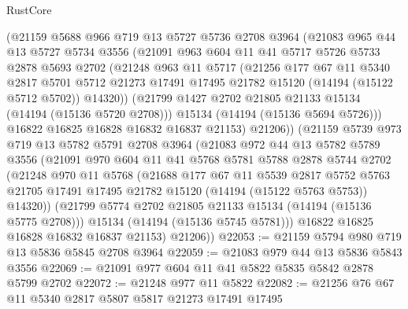 \begin{lexlean}{RustCore}
\begin{coremodule}
        (@21159
          @5688
          @966
          @719
          @13
          @5727
          @5736
          @2708
          @3964
          (@21083
            @965
            @44
            @13
            @5727
            @5734
            @3556
            (@21091
              @963
              @604
              @11
              @41
              @5717
              @5726
              @5733
              @2878
              @5693
              @2702
              (@21248
                @963
                @11
                @5717
                (@21256
                  @177
                  @67
                  @11
                  @5340
                  @2817
                  @5701
                  @5712
                  @21273
                  @17491
                  @17495
                  @21782
                  @15120
                  (@14194 (@15122 @5712 @5702))
                  @14320))
              (@21799 @1427 @2702 @21805 @21133 @15134 (@14194 (@15136 @5720 @2708)))
              @15134
              (@14194 (@15136 @5694 @5726)))
            @16822
            @16825
            @16828
            @16832
            @16837
            @21153)
          @21206))
      (@21159
        @5739
        @973
        @719
        @13
        @5782
        @5791
        @2708
        @3964
        (@21083
          @972
          @44
          @13
          @5782
          @5789
          @3556
          (@21091
            @970
            @604
            @11
            @41
            @5768
            @5781
            @5788
            @2878
            @5744
            @2702
            (@21248
              @970
              @11
              @5768
              (@21688
                @177
                @67
                @11
                @5539
                @2817
                @5752
                @5763
                @21705
                @17491
                @17495
                @21782
                @15120
                (@14194 (@15122 @5763 @5753))
                @14320))
            (@21799 @5774 @2702 @21805 @21133 @15134 (@14194 (@15136 @5775 @2708)))
            @15134
            (@14194 (@15136 @5745 @5781)))
          @16822
          @16825
          @16828
          @16832
          @16837
          @21153)
        @21206))
@22053 := @21159 @5794 @980 @719 @13 @5836 @5845 @2708 @3964
@22059 := @21083 @979 @44 @13 @5836 @5843 @3556
@22069 := @21091 @977 @604 @11 @41 @5822 @5835 @5842 @2878 @5799 @2702
@22072 := @21248 @977 @11 @5822
@22082 := @21256 @76 @67 @11 @5340 @2817 @5807 @5817 @21273 @17491 @17495

\end{coremodule}
\end{lexlean}
